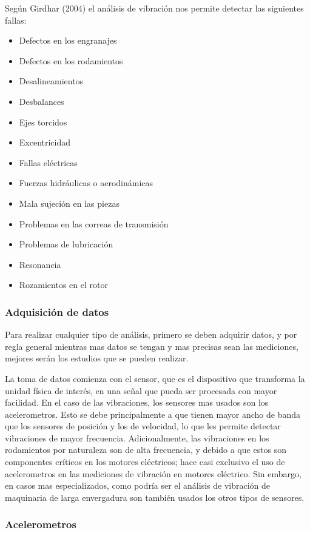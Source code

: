 Según Girdhar (2004) el análisis de vibración nos permite detectar las
siguientes fallas:

\begin{itemize}
\item{Defectos en los engranajes}
\item{Defectos en los rodamientos}
\item{Desalineamientos}
\item{Desbalances}
\item{Ejes torcidos}
\item{Excentricidad}
\item{Fallas eléctricas}
\item{Fuerzas hidráulicas o aerodinámicas}
\item{Mala sujeción en las piezas}
\item{Problemas en las correas de transmisión}
\item{Problemas de lubricación}
\item{Resonancia}
\item{Rozamientos en el rotor}
\end{itemize}

\subsubsection*{Adquisición de datos}

Para realizar cualquier tipo de análisis, primero se deben adquirir datos, y
por regla general mientras mas datos se tengan y mas precisas sean las
mediciones, mejores serán los estudios que se pueden realizar.

La toma de datos comienza con el sensor, que es el dispositivo que transforma
la unidad física de interés, en una señal que pueda ser procesada con mayor
facilidad. En el caso de las vibraciones, los sensores mas usados son los
acelerometros.  Esto se debe principalmente a que tienen mayor ancho de banda
que los sensores de posición y los de velocidad, lo que les permite detectar
vibraciones de mayor frecuencia. Adicionalmente, las vibraciones en los
rodamientos por naturaleza son de alta frecuencia, y debido a que estos son
componentes críticos en los motores eléctricos; hace casi exclusivo el uso de
acelerometros en las mediciones de vibración en motores eléctrico. Sin
embargo, en casos mas especializados, como podría ser el análisis de vibración
de maquinaria de larga envergadura son también usados los otros tipos de
sensores.

\subsubsection{Acelerometros}

